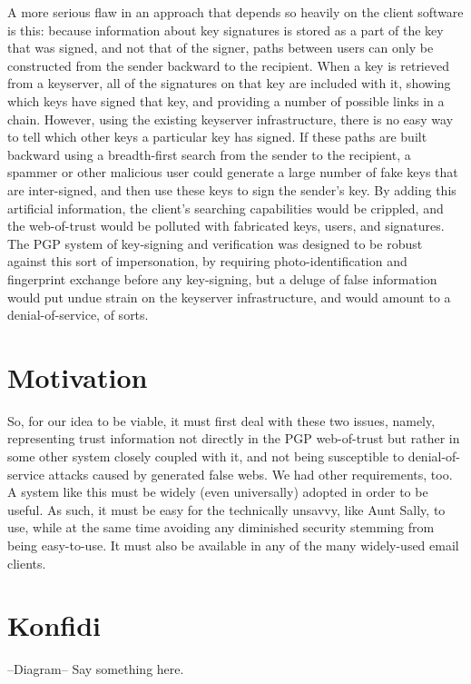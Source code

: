 \documentclass[onecolumn]{acm_proc_article-sp}
\begin{document}
A more serious flaw in an approach that depends so heavily on the client software is this:  because information about key signatures is stored as a part of the key that was signed, and not that of the signer, paths between users can only be constructed from the sender backward to the recipient. When a key is retrieved from a keyserver, all of the signatures on that key are included with it, showing which keys have signed that key, and providing a number of possible links in a chain. However, using the existing keyserver infrastructure, there is no easy way to tell which other keys a particular key has signed. If these paths are built backward using a breadth-first search from the sender to the recipient, a spammer or other malicious user could generate a large number of fake keys that are inter-signed, and then use these keys to sign the sender's key. By adding this artificial information, the client's searching capabilities would be crippled, and the web-of-trust would be polluted with fabricated keys, users, and signatures. The PGP system of key-signing and verification was designed to be robust against this sort of impersonation, by requiring photo-identification and fingerprint exchange before any key-signing, but a deluge of false information would put undue strain on the keyserver infrastructure, and would amount to a denial-of-service, of sorts.

\section{Motivation}
So, for our idea to be viable, it must first deal with these two issues, namely, representing trust information not directly in the PGP web-of-trust but rather in some other system closely coupled with it, and not being susceptible to denial-of-service attacks caused by generated false webs. We had other requirements, too. A system like this must be widely (even universally) adopted in order to be useful. As such, it must be easy for the technically unsavvy, like Aunt Sally, to use, while at the same time avoiding any diminished security stemming from being easy-to-use. It must also be available in any of the many widely-used email clients. 

\section{Konfidi}
--Diagram--
Say something here.
\end{document}
